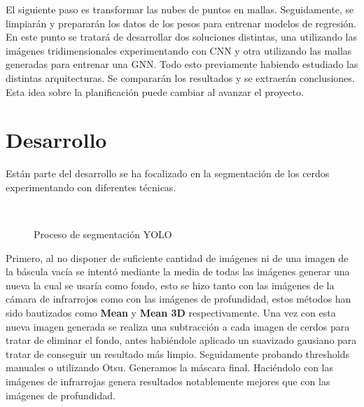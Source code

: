 \documentclass[12pt,a4paper]{article}
\begin{document}
El siguiente paso es transformar las nubes de puntos en mallas.
Seguidamente, se limpiarán y prepararán los datos de los pesos para entrenar modelos de regresión.
En este punto se tratará de desarrollar dos soluciones distintas, una utilizando las imágenes tridimensionales experimentando con CNN y otra utilizando las mallas generadas para entrenar una GNN. Todo esto previamente habiendo estudiado las distintas arquitecturas.
Se compararán los resultados y se extraerán conclusiones.
Esta idea sobre la planificación puede cambiar al avanzar el proyecto.







\section{Desarrollo}

Están parte del desarrollo se ha focalizado en la segmentación de los cerdos experimentando con diferentes técnicas.

\begin{figure}[ht]%
 \centering
 \\
 \caption{Proceso de segmentación YOLO}%
 \label{yoloimg}%
\end{figure}


Primero, al no disponer de suficiente cantidad de imágenes ni de una imagen de la báscula vacía se intentó mediante la media de todas las imágenes generar una nueva la cual se usaría como fondo, esto se hizo tanto con las imágenes de la cámara de infrarrojos como con las imágenes de profundidad, estos métodos han sido bautizados como \textbf{Mean} y \textbf{Mean 3D} respectivamente. Una vez con esta nueva imagen generada se realiza una subtracción a cada imagen de cerdos para tratar de eliminar el fondo, antes habiéndole aplicado un suavizado gausiano para tratar de conseguir un resultado más limpio. Seguidamente probando thresholds manuales o utilizando Otsu\cite{Otsu}. Generamos la máscara final. Haciéndolo con las imágenes de infrarrojas genera resultados notablemente mejores que con las imágenes de profundidad.
\end{document}
